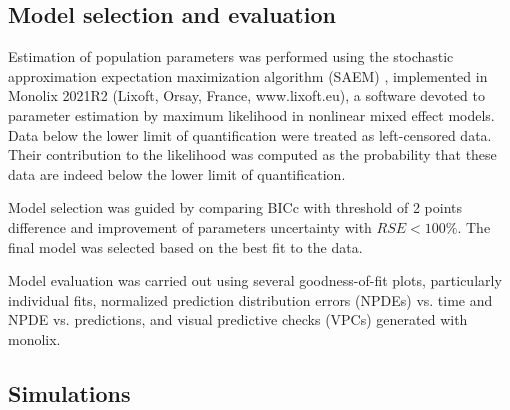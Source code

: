 \documentclass{article}
\begin{document}
%





\subsection{Model selection and evaluation}

Estimation of population parameters was performed using the stochastic approximation expectation maximization algorithm (SAEM) \cite{kuhn2005maximum}, implemented in Monolix 2021R2 (Lixoft, Orsay, France, www.lixoft.eu), a software devoted to parameter estimation by maximum likelihood in nonlinear mixed effect models. Data below the lower limit of quantification were treated as left-censored data. Their contribution to the likelihood was computed as the probability that these data are indeed below the lower limit of quantification\cite{samson2006extension}. 

Model selection was guided by comparing BICc with threshold of 2 points difference and improvement of parameters uncertainty with $RSE < 100\%$. The final model was selected based on the best fit to the data. 

Model evaluation was carried out using several goodness-of-fit plots, particularly individual fits, normalized prediction distribution errors (NPDEs) vs. time and NPDE vs. predictions, and visual predictive checks (VPCs) generated with monolix.


\subsection{Simulations}
\end{document}
